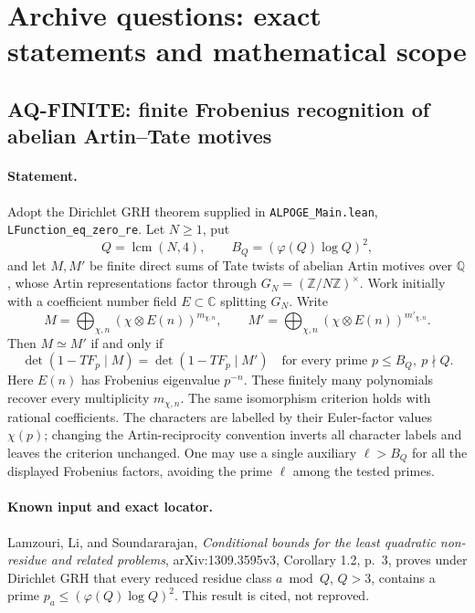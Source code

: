 \section{Archive questions: exact statements and mathematical scope}

\subsection{AQ-FINITE: finite Frobenius recognition of abelian Artin--Tate motives}
\paragraph{Statement.}
Adopt the Dirichlet GRH theorem supplied in \texttt{ALPOGE\_Main.lean},
\texttt{LFunction\_eq\_zero\_re}. Let $N\geq1$, put
\[
 Q=\operatorname{lcm}(N,4),\qquad B_Q=(\varphi(Q)\log Q)^2,
\]
and let $M,M'$ be finite direct sums of Tate twists of abelian Artin
motives over $\mathbb Q$, whose Artin representations factor through
$G_N=(\mathbb Z/N\mathbb Z)^\times$. Work initially with a coefficient
number field $E\subset\mathbb C$ splitting $G_N$. Write
\[
 M=\bigoplus_{\chi,n}(\chi\otimes E(n))^{m_{\chi,n}},
 \qquad
 M'=\bigoplus_{\chi,n}(\chi\otimes E(n))^{m'_{\chi,n}}.
\]
Then $M\simeq M'$ if and only if
\[
 \det(1-TF_p\mid M)=\det(1-TF_p\mid M')
 \quad\text{for every prime }p\leq B_Q,\ p\nmid Q.                 \tag{AQ.1}
\]
Here $E(n)$ has Frobenius eigenvalue $p^{-n}$. These finitely many
polynomials recover every multiplicity $m_{\chi,n}$. The same
isomorphism criterion holds with rational coefficients.
The characters are labelled by their Euler-factor values
$\chi(p)$; changing the Artin-reciprocity convention inverts
all character labels and leaves the criterion unchanged.
One may use a single auxiliary $\ell>B_Q$ for all the
displayed Frobenius factors, avoiding the prime $\ell$
among the tested primes.

\paragraph{Known input and exact locator.}
Lamzouri, Li, and Soundararajan, \emph{Conditional bounds for the least
quadratic non-residue and related problems}, arXiv:1309.3595v3,
Corollary 1.2, p.~3, proves under Dirichlet GRH that every reduced residue
class $a\bmod Q$, $Q>3$, contains a prime
$p_a\leq(\varphi(Q)\log Q)^2$. This result is cited, not reproved.

